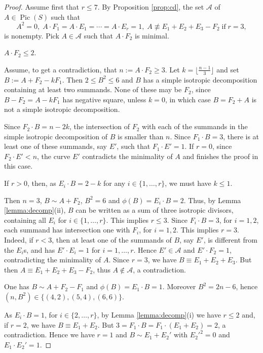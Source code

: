 \documentclass[11pt]{amsart}
\theoremstyle{definition}
\def\Pic{\operatorname{Pic}}
\begin{document}
\begin{proof}
Assume first that $r \leqslant 7$. 
By  Proposition \ref{prop:cd}, the set $\mathcal A$ of $A \in \Pic(S)$ such that 
\[ A^2=0,  \; A \cdot F_1=A \cdot E_1=\cdots= A \cdot E_r=1,
 \; A \not \equiv E_1+E_2+E_3-F_2 \; \mbox{if} \; r=3,
\]
is nonempty. Pick $A\in \mathcal A$ such that $A \cdot F_2$ is minimal. \medskip

  $A \cdot F_2 \leqslant 2$. \medskip

Assume, to get a contradiction, that $n:=A \cdot F_2 \geqslant 3$. Let $k=\lfloor \frac{n-1}{3}\rfloor$ and set $B:=A+F_2-kF_1$. Then $2 \leqslant B^2 \leqslant 6$ and $B$ has a simple isotropic decomposition containing at least two summands.
None of these may be $F_2$, since $B-F_2=A-kF_1$ \color{black} has negative square\color{black}, unless $k=0$, in which case $B=F_2+A$ is not a simple isotropic decomposition.  

Since $F_2 \cdot B=n-2k$, the intersection of $F_2$ with each of the summands in the simple
isotropic decomposition of $B$ is smaller than $n$. 
Since $F_1 \cdot B=3$, there is at least one of these summands, say $E'$, such that $F_1 \cdot E'=1$. If $r=0$, since $F_2 \cdot E' <n$, the curve $E'$ contradicts the minimality of $A$ and finishes the proof in this case. 

If $r>0$, then, as $E_i \cdot B =2-k$ for any $i \in \{1,\ldots,r\}$, we must have $ k \leqslant 1$. \medskip

 Then $n=3$, $B \sim A+F_2$, $B^2=6$ and $\phi(B)=E_i \cdot B=2$. 
Thus, by Lemma \ref {lemma:decomp}\color{black}(ii)\color{black}, $B$ can be written as a sum of three isotropic divisors, containing all $E_i$ for  $i \in \{1,\ldots,r\}$. This implies $r\leqslant 3$. 
Since $F_i \cdot B=3$, for $i=1,2$, each summand has intersection one with $F_i$, for $i=1,2$. This implies $r=3$. Indeed, if $r<3$, then at least one of the summands of $B$, say $E'$, is different from the $E_i$s, and has $E'\cdot E_i=1$ for $i=1,\ldots, r$. Hence $E'\in \mathcal A$ and $E'\cdot F_2=1$, contradicting the minimality of $A$. Since $r=3$, we have $B \equiv E_1+E_2+E_3$. But then $A \equiv E_1+E_2+E_3-F_2$, thus $A\not\in \mathcal A$, a contradiction.  \medskip

  One has $B \sim A+F_2-F_1$ and $\phi(B)=E_1 \cdot B=1$. Moreover $B^ 2=2n-6$, hence $(n,B^2) \in \{(4,2),(5,4),(6,6)\}$.\medskip

 As $E_i \cdot B=1$,  for $i \in \{2,\ldots,r\}$, by Lemma \ref {lemma:decomp}(i) we have $r\leqslant 2$ and, if $r=2$, we have $B\equiv E_1+E_2$. But $3=F_1\cdot B=F_1\cdot (E_1+E_2)=2$, a contradiction. Hence we have $r=1$ and $B \sim E_1+E_2'$ with ${E_2'}^2=0$ and $E_1 \cdot E_2'=1$. 


\end{proof}
\end{document}
